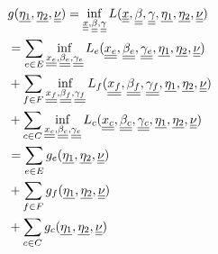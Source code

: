 \documentclass[conference]{IEEEtran}
\begin{document}
    \begin{subequations}
      \begin{align}
        & \notag g(\underline {\eta_1}, \underline {\eta_2}, \underline{\underline \nu}) = \inf_{\underline{\underline x}, \underline{\underline \beta}, \underline{\underline \gamma}}L(\underline{\underline x}, \underline{\underline \beta}, \underline{\underline \gamma}, \underline{\eta_1},\underline{\eta_2}, \underline{\underline \nu}) \\
        & \notag = \sum_{e \in E}\inf_{\underline{\underline {x_e}}, \underline{\underline {\beta_e}}, \underline{\underline {\gamma_e}}}L_e(\underline{\underline {x_e}}, \underline{\underline {\beta_e}}, \underline{\underline {\gamma_e}}, \underline {\eta_1}, \underline {\eta_2}, \underline{\underline \nu}) \\
        & \notag + \sum_{f \in F}\inf_{\underline{\underline {x_f}}, \underline{\underline {\beta_f}}, \underline{\underline {\gamma_f}}}L_f(\underline{\underline {x_f}}, \underline{\underline {\beta_f}}, \underline{\underline {\gamma_f}}, \underline {\eta_1}, \underline {\eta_2}, \underline{\underline \nu}) \\
        & \notag + \sum_{c \in C}\inf_{\underline{\underline {x_c}}, \underline{\underline {\beta_c}}, \underline{\underline {\gamma_c}}}L_c(\underline{\underline {x_c}}, \underline{\underline {\beta_c}}, \underline{\underline {\gamma_c}}, \underline {\eta_1}, \underline {\eta_2}, \underline{\underline \nu}) \\
        & \notag = \sum_{e \in E}g_e(\underline {\eta_1}, \underline {\eta_2}, \underline{\underline \nu}) \\
        & \notag + \sum_{f \in F}g_f(\underline {\eta_1}, \underline {\eta_2}, \underline{\underline \nu}) \\
        & + \sum_{c \in C}g_c(\underline {\eta_1}, \underline {\eta_2}, \underline{\underline \nu})
      \end{align}
    \end{subequations}
\end{document}
